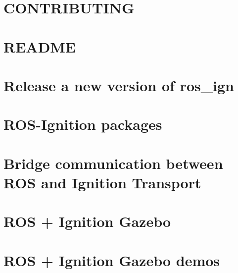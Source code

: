 \let\mypdfximage\pdfximage\def\pdfximage{\immediate\mypdfximage}\documentclass[twoside]{book}
\newcommand{\+}{\discretionary{\mbox{\scriptsize$\hookleftarrow$}}{}{}}
\begin{document}
\chapter{C\+O\+N\+T\+R\+I\+B\+U\+T\+I\+NG}
\label{md_catkin_ws_src_utilities_ros_ign_CONTRIBUTING}

\chapter{R\+E\+A\+D\+ME}
\label{md_catkin_ws_src_utilities_ros_ign_README}

\chapter{Release a new version of ros\+\_\+ign}
\label{md_catkin_ws_src_utilities_ros_ign_RELEASING}

\chapter{R\+O\+S-\/\+Ignition packages}
\label{md_catkin_ws_src_utilities_ros_ign_ros_ign_README}

\chapter{Bridge communication between R\+OS and Ignition Transport}
\label{md_catkin_ws_src_utilities_ros_ign_ros_ign_bridge_README}

\chapter{R\+OS + Ignition Gazebo}
\label{md_catkin_ws_src_utilities_ros_ign_ros_ign_gazebo_README}

\chapter{R\+OS + Ignition Gazebo demos}
\label{md_catkin_ws_src_utilities_ros_ign_ros_ign_gazebo_demos_README}

\end{document}
